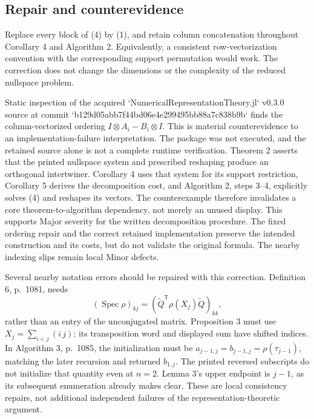 \documentclass[10pt]{article}
\begin{document}
\subsection*{Repair and counterevidence}
Replace every block of (4) by (1), and retain column concatenation throughout Corollary 4 and Algorithm 2. Equivalently, a consistent row-vectorization convention with the corresponding support permutation would work. The correction does not change the dimensions or the complexity of the reduced nullspace problem.\par
Static inspection of the acquired `NumericalRepresentationTheory.jl` v0.3.0 source at commit `b129d05abb7f44bd06e4e299495bb88a7c838b9b` finds the column-vectorized ordering \(I\otimes A_i-B_i\otimes I\). This is material counterevidence to an implementation-failure interpretation. The package was not executed, and the retained source alone is not a complete runtime verification. Theorem 2 asserts that the printed nullspace system and prescribed reshaping produce an orthogonal intertwiner. Corollary 4 uses that system for its support restriction, Corollary 5 derives the decomposition cost, and Algorithm 2, steps 3–4, explicitly solves (4) and reshapes its vectors. The counterexample therefore invalidates a core theorem-to-algorithm dependency, not merely an unused display. This supports Major severity for the written decomposition procedure. The fixed ordering repair and the correct retained implementation preserve the intended construction and its costs, but do not validate the original formula. The nearby indexing slips remain local Minor defects.\par
Several nearby notation errors should be repaired with this correction. Definition 6, p. 1081, needs \[(\operatorname{Spec}\rho)_{kj}
   =(\widetilde Q^{\mathsf T}\rho(X_j)\widetilde Q)_{kk},\] rather than an entry of the unconjugated matrix. Proposition 3 must use \(X_j=\sum_{i<j}(i\,j)\); its transposition word and displayed sum have shifted indices. In Algorithm 3, p. 1085, the initialization must be \(a_{j-1,j}=b_{j-1,j}=\rho(\tau_{j-1})\), matching the later recursion and returned \(b_{1,j}\). The printed reversed subscripts do not initialize that quantity even at \(n=2\). Lemma 3’s upper endpoint is \(j-1\), as its subsequent enumeration already makes clear. These are local consistency repairs, not additional independent failures of the representation-theoretic argument.\par
\end{document}
